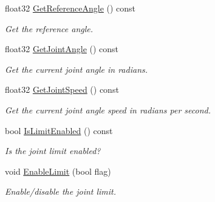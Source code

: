 \begin{DoxyCompactItemize}
\mbox{\label{classb2RevoluteJoint_ae84b9659fe94f41f54f43d3f64ee0741}} 
float32 \mbox{\hyperlink{classb2RevoluteJoint_ae84b9659fe94f41f54f43d3f64ee0741}{Get\+Reference\+Angle}} () const
\begin{DoxyCompactList}\small\item\em Get the reference angle. \end{DoxyCompactList}\item 
\mbox{\label{classb2RevoluteJoint_a2a83b2276c71bf287771004838f2b507}} 
float32 \mbox{\hyperlink{classb2RevoluteJoint_a2a83b2276c71bf287771004838f2b507}{Get\+Joint\+Angle}} () const
\begin{DoxyCompactList}\small\item\em Get the current joint angle in radians. \end{DoxyCompactList}\item 
\mbox{\label{classb2RevoluteJoint_a631b7bd2c72b61f03b6efc605308092f}} 
float32 \mbox{\hyperlink{classb2RevoluteJoint_a631b7bd2c72b61f03b6efc605308092f}{Get\+Joint\+Speed}} () const
\begin{DoxyCompactList}\small\item\em Get the current joint angle speed in radians per second. \end{DoxyCompactList}\item 
\mbox{\label{classb2RevoluteJoint_a84ff9c4f82b3e7d27a4390164f81f3ab}} 
bool \mbox{\hyperlink{classb2RevoluteJoint_a84ff9c4f82b3e7d27a4390164f81f3ab}{Is\+Limit\+Enabled}} () const
\begin{DoxyCompactList}\small\item\em Is the joint limit enabled? \end{DoxyCompactList}\item 
\mbox{\label{classb2RevoluteJoint_a56bdfdd04e906e52d0258f6a481b9093}} 
void \mbox{\hyperlink{classb2RevoluteJoint_a56bdfdd04e906e52d0258f6a481b9093}{Enable\+Limit}} (bool flag)
\begin{DoxyCompactList}\small\item\em Enable/disable the joint limit. \end{DoxyCompactList}\item 
\mbox{\label{classb2RevoluteJoint_a1e34ad0cc3289d90bff8140c5d6261d2}} 

\end{DoxyCompactItemize}
